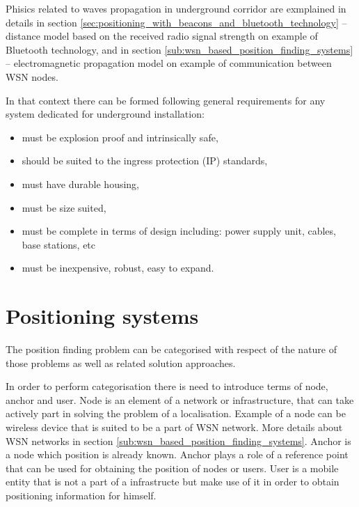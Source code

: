 \documentclass[../main.tex]{subfiles}
\begin{document}
Phisics related to waves propagation in underground corridor are exmplained in details in section \ref{sec:positioning_with_beacons_and_bluetooth_technology}  -- distance model based on the received radio signal strength on example of Bluetooth technology, and in section \ref{sub:wsn_based_position_finding_systems} -- electromagnetic propagation model on example of communication between WSN nodes.

In that context there can be formed following general requirements for any system dedicated for underground installation\cite{Book_wireless_in_mines}:
\begin{itemize}
	\item must be explosion proof and intrinsically safe,
	\item should be suited to the ingress protection (IP) standards,
	\item must have durable housing,
	\item must be size suited,
	\item must be complete in terms of design including: power supply unit, cables, base stations, etc
	\item must be inexpensive, robust, easy to expand.
\end{itemize}

\section{Positioning systems}

The position finding problem can be categorised with respect of the nature of those problems as well as related solution approaches.

In order to perform categorisation there is need to introduce terms of node, anchor and user. Node is an element of a network or infrastructure, that can take actively part in solving the problem of a localisation. Example of a node can be wireless device that is suited to be a part of WSN network. More details about WSN networks in section \ref{sub:wsn_based_position_finding_systems}. Anchor is a node which position is already known. Anchor plays a role of a reference point that can be used for obtaining the position of nodes or users. User is a mobile entity that is not a part of a infrastructe but make use of it in order to obtain positioning information for himself.
\end{document}
